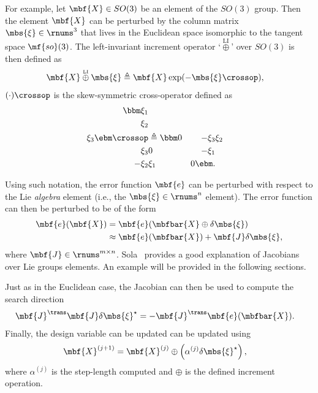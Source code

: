 \documentclass[ nobib, nofonts, notoc]{tufte-handout}
\newcommand{\liplus}{\overset{{\scriptscriptstyle\mathrm{LI}}}{\oplus}}
\begin{document}
    For example, let $\mbf{X}\in SO(3)$ be an element of the $SO(3)$ group. 
    Then the element $\mbf{X}$ can be perturbed by the column matrix $\mbs{\xi}\in\rnums^{3}$ that lives in the Euclidean space isomorphic to the tangent space $\mf{so}(3)$. 
    The left-invariant increment operator `$\liplus$' over $SO(3)$ is then defined as
    \begin{align}
        \mbf{X} \liplus \mbs{\xi} &\triangleq \mbf{X}\exp(-\mbs{\xi}\crossop),
    \end{align}    
     $(\cdot)\crossop$ is the skew-symmetric cross-operator defined as \cite{Barfoot_State_2017a}
    \begin{align}
        \bbm
            \xi_{1}\\
            \xi_{2}\\
            \xi_{3}
        \ebm\crossop
        &\triangleq
        \bbm
            0 & -\xi_{3} & \xi_{2} \\ 
            \xi_{3} & 0 & -\xi_{1}\\
            -\xi_{2} & \xi_{1} & 0
        \ebm.
    \end{align}

    Using such notation, the error function $\mbf{e}$ can be perturbed with respect to the Lie \emph{algebra} element (i.e., the $\mbs{\xi}\in\rnums^{n}$ element).
    The error function can then be perturbed to be of the form
    \begin{align}
        \mbf{e}(\mbf{X}) 
        &= \mbf{e}(\mbfbar{X}\oplus \delta\mbs{\xi})\\
        &\approx \mbf{e}(\mbfbar{X}) + \mbf{J}\delta\mbs{\xi},
    \end{align}
    where $\mbf{J}\in\rnums^{m\times n}$.
    Sola~\cite{Sola_micro_2019} provides a good explanation of Jacobians over Lie groups elements.
    An example will be provided in the following sections.

    Just as in the Euclidean case, the Jacobian can then be used to compute the search direction
    \begin{align}
        \mbf{J}^{\trans}\mbf{J}\delta\mbs{\xi}^{\star} &= -\mbf{J}^{\trans}\mbf{e}(\mbfbar{X}).
    \end{align}
    Finally, the design variable can be updated can be updated using
    \begin{align}
        \mbf{X}^{(j+1)} &= \mbf{X}^{(j)}\oplus \left( \alpha^{(j)}\delta\mbs{\xi}^{\star} \right),
    \end{align}
    where $\alpha^{(j)}$ is the step-length computed and $\oplus$ is the defined increment operation.
    
\end{document}

